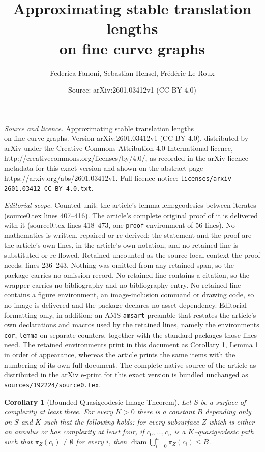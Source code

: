 \documentclass[10pt,a4paper]{amsart}
\title{Approximating stable translation lengths\\ on fine curve graphs}
\author{Federica Fanoni, Sebastian Hensel, Fr\'ed\'eric Le Roux}
\date{Source: arXiv:2601.03412v1 (CC BY 4.0)}
\newtheorem{cor}{Corollary}
\newcommand{\diam}{\operatorname{diam}}
\begin{document}
\maketitle

\noindent\emph{Source and licence.} Approximating stable translation lengths\\ on fine curve graphs. Version arXiv:2601.03412v1 (CC BY 4.0), distributed by arXiv under the Creative Commons Attribution 4.0 International licence, http://creativecommons.org/licenses/by/4.0/, as recorded in the arXiv licence metadata for this exact version and shown on the abstract page https://arxiv.org/abs/2601.03412v1. Full licence notice: \texttt{licenses/arxiv-2601.03412-CC-BY-4.0.txt}.\par\smallskip

\noindent\textit{Editorial scope.} Counted unit: the article's lemma lem:geodesics-between-iterates (source0.tex lines 407--416). The article's complete original proof of it is delivered with it (source0.tex lines 418--473, one \texttt{proof} environment of 56 lines). No mathematics is written, repaired or re-derived: the statement and the proof are the article's own lines, in the article's own notation, and no retained line is substituted or re-flowed.  Retained uncounted as the source-local context the proof needs: lines 236--243.  Nothing was omitted from any retained span, so the package carries no omission record.  No retained line contains a citation, so the wrapper carries no bibliography and no bibliography entry.  No retained line contains a figure environment, an image-inclusion command or drawing code, so no image is delivered and the package declares no asset dependency.  Editorial formatting only, in addition: an AMS \texttt{amsart} preamble that restates the article's own declarations and macros used by the retained lines, namely the environments \texttt{cor}, \texttt{lemma} on separate counters, together with the standard packages those lines need.  The retained environments print in this document as Corollary 1, Lemma 1 in order of appearance, whereas the article prints the same items with the numbering of its own full document.  The complete native source of the article as distributed in the arXiv e-print for this exact version is bundled unchanged as \texttt{sources/192224/source0.tex}.
\begin{cor}[Bounded Quasigeodesic Image Theorem]\label{cor:qBGIT}
  Let \(S\) be a surface of complexity at least three. For every $K>0$
  there is a constant \(B\) depending only on \(S\) and $K$ such that
  the following holds: for every subsurface \(Z\) which is either an
  annulus or has complexity at least four, if \(c_0,\dots,c_n\) is a
  $K$--quasigeodesic path such that \(\pi_Z(c_i)\neq\emptyset\) for
  every \(i\), then \(\diam \bigcup_{i=0}^n\pi_Z(c_i)\leq B\).
\end{cor}
\end{document}
